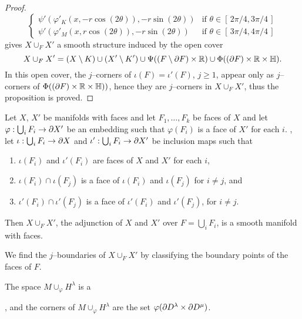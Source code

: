 \begin{proof}
\[\begin{cases}
			\psi'(\varphi'_K(x,-r\cos(2\theta)),-r\sin(2\theta))				
				&	\mbox{if } \theta\in[\,2\pi/4,3\pi/4\,]	\\
			\psi'(\varphi'_M(x,r\cos(2\theta)),-r\sin(2\theta))				
				&	\mbox{if } \theta\in[\,3\pi/4,4\pi/4\,]
		\end{cases}	
	\]
	gives $X\cup_F X'$ a smooth structure induced by the open cover
	\[
		X\cup_F X'=(X\setminus K)\cup(X'\setminus K')\cup\Psi((F\setminus\partial F)\times\mathbb{R})\cup	\Phi((\partial F)\times\mathbb{R}\times\mathbb{H}).
	\]
	In this open cover, the $j$--corners of $\iota(F)=\iota'(F)$, $j\geq 1$, appear only as $j$--corners of $\Phi((\partial F)\times\mathbb{R}\times\mathbb{H}))$, hence they are $j$--corners in $X\cup_F X'$, thus the proposition is proved.
\end{proof}





\begin{cor}
	Let $X$, $X'$ be manifolds with faces and let $F_1,\dots, F_k$ be faces of $X$ and let $\varphi:\bigcup_i F_i\to \partial X'$ be an embedding such that $\varphi(F_i)$ is a face of $X'$ for each $i$.
	, let $\iota:\bigcup_i F_i\to \partial X$ and $\iota':\bigcup_i F_i\to \partial X'$ be inclusion maps such that 
	\begin{enumerate}
		\item $\iota(F_i)$ and $\iota'(F_i)$ are faces of $X$ and $X'$ for each $i$,
		\item $\iota(F_i)\cap \iota(F_j)$ is a face of $\iota(F_i)$ and $\iota(F_j)$ for $i\neq j$, and
		\item $\iota'(F_i)\cap\iota'(F_j)$ is a face of $\iota'(F_i)$ and $\iota'(F_j)$, for $i\neq j$.
	\end{enumerate}
	Then $X \cup_F X'$, the adjunction of $X$ and $X'$ over $F=\bigcup_i F_i$, is a smooth manifold with faces.

	We find the $j$--boundaries of $X\cup_F X'$ by classifying the boundary points of the faces of $F$.
\end{cor}

The space $M\cup_\varphi H^\lambda$ is a 


, and the corners of $M\cup_\varphi H^\lambda$ are the set $\varphi(\partial D^\lambda\times\partial D^\mu)$.


